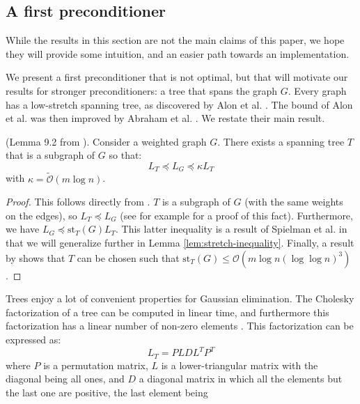 


\subsection{A first preconditioner\label{sec:A-first-preconditioner}}

While the results in this section are not the main claims of this
paper, we hope they will provide some intuition, and an easier path
towards an implementation.

We present a first preconditioner that is not optimal, but that will
motivate our results for stronger preconditioners: a tree that spans
the graph $G$. Every graph has a low-stretch spanning tree, as discovered
by Alon et al. \cite{Alon1995}. The bound of Alon et al. was then
improved by Abraham et al. \cite{Abraham2008}. We restate their main
result. 
\begin{lemma}
(Lemma 9.2 from \cite{Spielman2009a}). Consider a weighted graph
$G$. There exists a spanning tree $T$ that is a subgraph of $G$
so that: 
\[
L_{T}\preceq L_{G}\preceq\kappa L_{T}
\]
with $\kappa=\tilde{\mathcal{O}}\left(m\log n\right)$. %
\label{lem:tree-st} \end{lemma}
\begin{proof}
This follows directly from \cite{Spielman2009a}. $T$ is a subgraph
of $G$ (with the same weights on the edges), so $L_{T}\preceq L_{G}$
(see \cite{Spielman2009a} for example for a proof of this fact).
Furthermore, we have $L_{G}\preceq\text{st}_{T}\left(G\right)L_{T}$.
This latter inequality is a result of Spielman et al. in \cite{Spielman2010}
that we will generalize further in Lemma \ref{lem:stretch-inequality}.
Finally, a result by \cite{Abraham2008} shows that $T$ can be chosen
such that $\text{st}_{T}\left(G\right)\leq\mathcal{O}(m\log n(\log\log n)^{3})$. 
\end{proof}
Trees enjoy a lot of convenient properties for Gaussian elimination.
The Cholesky factorization of a tree can be computed in linear time,
and furthermore this factorization has a linear number of non-zero
elements \cite{Spielman2009a}. This factorization can be expressed
as: 
\[
L_{T}=PLDL^{T}P^{T}
\]
where $P$ is a permutation matrix, $L$ is a lower-triangular matrix
with the diagonal being all ones, and $D$ a diagonal matrix in which
all the elements but the last one are positive, the last element being

